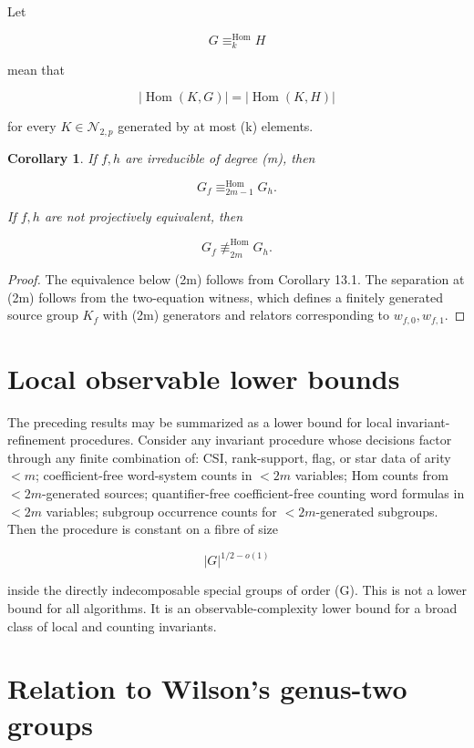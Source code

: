 \documentclass[11pt]{article}
\newtheorem{corollary}[theorem]{Corollary}
\begin{document}
Let

\[
G\equiv_k^{\mathrm{Hom}}H
\]

mean that

\[
|\operatorname{Hom}(K,G)|
=|\operatorname{Hom}(K,H)|
\]

for every $K\in\mathcal N_{2,p}$ generated by at most (k) elements.

\begin{corollary}
If $f,h$ are irreducible of degree (m), then

\[
G_f\equiv_{2m-1}^{\mathrm{Hom}}G_h.
\]

If $f,h$ are not projectively equivalent, then

\[
G_f\not\equiv_{2m}^{\mathrm{Hom}}G_h.
\]

\end{corollary}

\begin{proof}
The equivalence below (2m) follows from Corollary 13.1. The separation at (2m) follows from the two-equation witness, which defines a finitely generated source group $K_f$ with (2m) generators and relators corresponding to $w_{f,0},w_{f,1}$.

\end{proof}

\section{Local observable lower bounds}

The preceding results may be summarized as a lower bound for local invariant-refinement procedures. Consider any invariant procedure whose decisions factor through any finite combination of: CSI, rank-support, flag, or star data of arity $<m$; coefficient-free word-system counts in $<2m$ variables; Hom counts from $<2m$-generated sources; quantifier-free coefficient-free counting word formulas in $<2m$ variables; subgroup occurrence counts for $<2m$-generated subgroups. Then the procedure is constant on a fibre of size

\[
|G|^{1/2-o(1)}
\]

inside the directly indecomposable special groups of order (G). This is not a lower bound for all algorithms. It is an observable-complexity lower bound for a broad class of local and counting invariants.

\section{Relation to Wilson's genus-two groups}
\end{document}

